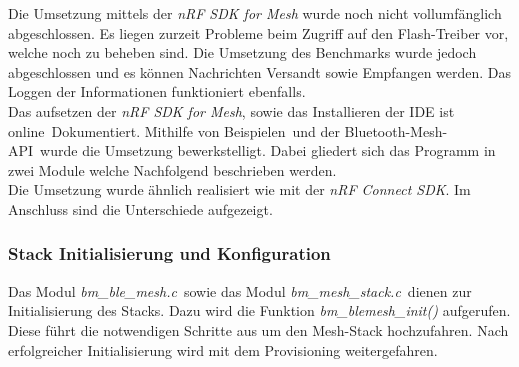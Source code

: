 Die Umsetzung mittels der \textit{nRF SDK for Mesh} wurde noch nicht vollumfänglich abgeschlossen. Es liegen zurzeit Probleme beim Zugriff auf den Flash-Treiber vor, welche noch zu beheben sind. Die Umsetzung des Benchmarks wurde jedoch abgeschlossen und es können Nachrichten Versandt sowie Empfangen werden. Das Loggen der Informationen funktioniert ebenfalls. \\

Das aufsetzen der \textit{nRF SDK for Mesh}, sowie das Installieren der IDE ist online\footnotemark\ Dokumentiert. Mithilfe von Beispielen\footnotemark\ und der Bluetooth-Mesh-API\footnotemark\ wurde die Umsetzung bewerkstelligt. Dabei gliedert sich das Programm in zwei Module welche Nachfolgend beschrieben werden.\\

Die Umsetzung wurde ähnlich realisiert wie mit der \textit{nRF Connect SDK}. Im Anschluss sind die Unterschiede aufgezeigt. 






\subsubsection{Stack Initialisierung und Konfiguration}\label{subsubsec:BluetoothMeshUmsetzungnRFSDKInitandConfig} 

Das Modul \textit{bm\_ble\_mesh.c}\footnotemark\ sowie das Modul \textit{bm\_mesh\_stack.c}\footnotemark\ dienen zur Initialisierung des Stacks. Dazu wird die Funktion \textit{bm\_blemesh\_init()} aufgerufen. Diese führt die notwendigen Schritte aus um den Mesh-Stack hochzufahren. Nach erfolgreicher Initialisierung wird mit dem Provisioning weitergefahren. \\




